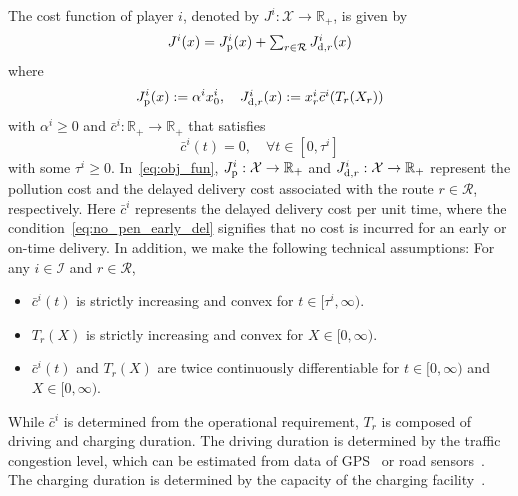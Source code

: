 \documentclass[letterpaper, 10 pt, conference]{ieeeconf}  %
\newcommand{\mc}[1]{\mathcal{#1}}
\newcommand{\bR}{\mathbb{R}}
\newtheorem{assum}{Assumption}
\begin{document}
The cost function of player $i$, denoted by $J^i:\mc{X}\to\bR_+$, is given by
\begin{equation}\label{eq:obj_fun}
 \textstyle{
  J^i(x)=J^i_{\rm p}(x)+\sum_{r\in\mc{R}}J^i_{{\rm d},r}(x)
 }
\end{equation}
where
\[
 J^i_{\rm p}(x):=\alpha^i x^i_0,\quad
 \textstyle{
  J^i_{{\rm d},r}(x):=x^i_r \bar{c}^i(T_r(X_r))
 }
\]
with $\alpha^i\geq 0$ and $\bar{c}^i:\bR_+\to\bR_+$ that satisfies
\begin{equation}\label{eq:no_pen_early_del}
 \bar{c}^i(t)=0,\quad \forall t\in[0,\tau^i]
\end{equation}
with some $\tau^i\geq0$.
In~\eqref{eq:obj_fun}, $J^i_{\rm p}:\mc{X}\to\bR_+$ and $J^i_{{\rm d},r}:\mc{X}\to\bR_+$ represent the pollution cost and the delayed delivery cost associated with the route $r\in\mc{R}$, respectively.
Here $\bar{c}^i$ represents the delayed delivery cost per unit time,
where the condition~\eqref{eq:no_pen_early_del} signifies that no cost is incurred for an early or on-time delivery.
In addition, we make the following technical assumptions:
For any $i \in \mc{I}$ and $r\in\mc{R}$,
\begin{itemize}
\item $\bar{c}^i(t)$ is strictly increasing and convex for $t\in[\tau^i,\infty)$.
\item $T_r(X)$ is strictly increasing and convex for $X\in[0,\infty)$.
\item $\bar{c}^i(t)$ and $T_r(X)$ are twice continuously differentiable for $t\in[0,\infty)$ and $X\in[0,\infty)$.
\end{itemize}
While $\bar{c}^i$ is determined from the operational requirement, $T_r$ is composed of driving and charging duration.
The driving duration is determined by the traffic congestion level, which can be estimated from data of GPS~\cite{Work2010Traffic} or road sensors~\cite{Polson2017Deep}.
The charging duration is determined by the capacity of the charging facility~\cite{Tomaszewska2019Lithium}.
\end{document}
